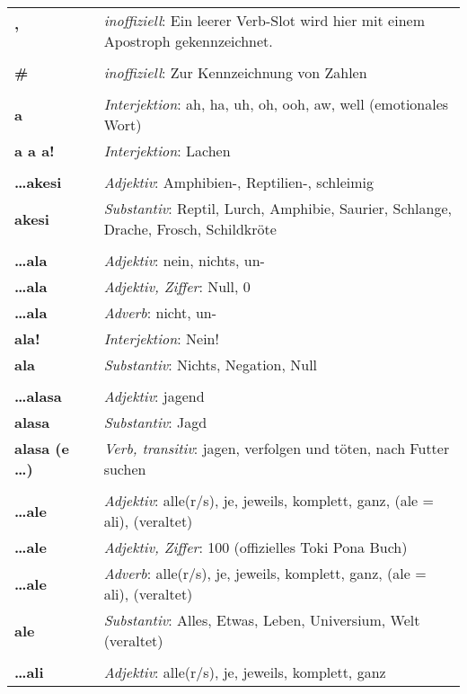 \begin{supertabular}{p{2,5cm}|ll}
\textbf{'} && \textit{inoffiziell}: Ein leerer Verb-Slot wird hier mit einem Apostroph gekennzeichnet. \\ 
 && \\ %
\textbf{\#} && \textit{inoffiziell}: Zur Kennzeichnung von Zahlen \\ 
 && \\ %
\textbf{a} && \textit{Interjektion}: ah, ha, uh, oh, ooh, aw, well  (emotionales Wort) \\ 
\textbf{a a a!} && \textit{Interjektion}: Lachen \\ 
 && \\ %
\textbf{\dots akesi} && \textit{Adjektiv}: Amphibien-, Reptilien-, schleimig \\ 
\textbf{akesi} && \textit{Substantiv}: Reptil, Lurch, Amphibie, Saurier, Schlange, Drache, Frosch, Schildkröte \\ 
 && \\ %
\textbf{\dots ala} && \textit{Adjektiv}: nein, nichts, un- \\ 
\textbf{\dots ala} && \textit{Adjektiv, Ziffer}: Null, 0 \\ 
\textbf{\dots ala} && \textit{Adverb}: nicht, un- \\ 
\textbf{ala!} && \textit{Interjektion}: Nein! \\ 
\textbf{ala} && \textit{Substantiv}: Nichts, Negation, Null \\ 
 && \\ %
\textbf{\dots alasa} && \textit{Adjektiv}: jagend \\ 
\textbf{alasa} && \textit{Substantiv}: Jagd \\ 
\textbf{alasa (e \dots)} && \textit{Verb, transitiv}: jagen, verfolgen und töten, nach Futter suchen \\ 
 && \\ %
\textbf{\dots ale} && \textit{Adjektiv}: alle(r/s), je, jeweils, komplett, ganz, (ale = ali), (veraltet) \\ 
\textbf{\dots ale} && \textit{Adjektiv, Ziffer}: 100 (offizielles Toki Pona Buch) \\ 
\textbf{\dots ale} && \textit{Adverb}: alle(r/s), je, jeweils, komplett, ganz, (ale = ali), (veraltet) \\ 
\textbf{ale} && \textit{Substantiv}:  Alles, Etwas, Leben, Universium, Welt (veraltet) \\ 
 && \\ %
\textbf{\dots ali} && \textit{Adjektiv}: alle(r/s), je, jeweils, komplett, ganz \\ 

\end{supertabular}
